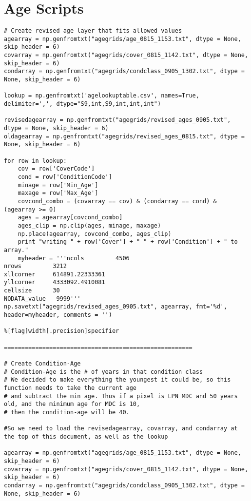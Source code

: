 \section{Age Scripts}
\begin{lstlisting}
# Create revised age layer that fits allowed values
agearray = np.genfromtxt("agegrids/age_0815_1153.txt", dtype = None, skip_header = 6)
covarray = np.genfromtxt("agegrids/cover_0815_1142.txt", dtype = None, skip_header = 6)
condarray = np.genfromtxt("agegrids/condclass_0905_1302.txt", dtype = None, skip_header = 6)

lookup = np.genfromtxt('agelookuptable.csv', names=True, delimiter=',', dtype="S9,int,S9,int,int,int")

revisedagearray = np.genfromtxt("agegrids/revised_ages_0905.txt", dtype = None, skip_header = 6)
oldagearray = np.genfromtxt("agegrids/revised_ages_0815.txt", dtype = None, skip_header = 6)

for row in lookup:
    cov = row['CoverCode']
    cond = row['ConditionCode']
    minage = row['Min_Age']
    maxage = row['Max_Age']
    covcond_combo = (covarray == cov) & (condarray == cond) & (agearray >= 0)
    ages = agearray[covcond_combo]
    ages_clip = np.clip(ages, minage, maxage)
    np.place(agearray, covcond_combo, ages_clip)
    print "writing " + row['Cover'] + " " + row['Condition'] + " to array."
    myheader = '''ncols         4506
nrows         3212
xllcorner     614891.22333361
yllcorner     4333092.4910081
cellsize      30
NODATA_value  -9999'''
np.savetxt("agegrids/revised_ages_0905.txt", agearray, fmt='%d', header=myheader, comments = '')

%[flag]width[.precision]specifier

======================================================

# Create Condition-Age
# Condition-Age is the # of years in that condition class
# We decided to make everything the youngest it could be, so this function needs to take the current age
# and subtract the min age. Thus if a pixel is LPN MDC and 50 years old, and the minimum age for MDC is 10,
# then the condition-age will be 40. 

#So we need to load the revisedagearray, covarray, and condarray at the top of this document, as well as the lookup

agearray = np.genfromtxt("agegrids/age_0815_1153.txt", dtype = None, skip_header = 6)
covarray = np.genfromtxt("agegrids/cover_0815_1142.txt", dtype = None, skip_header = 6)
condarray = np.genfromtxt("agegrids/condclass_0905_1302.txt", dtype = None, skip_header = 6)


\end{lstlisting}
